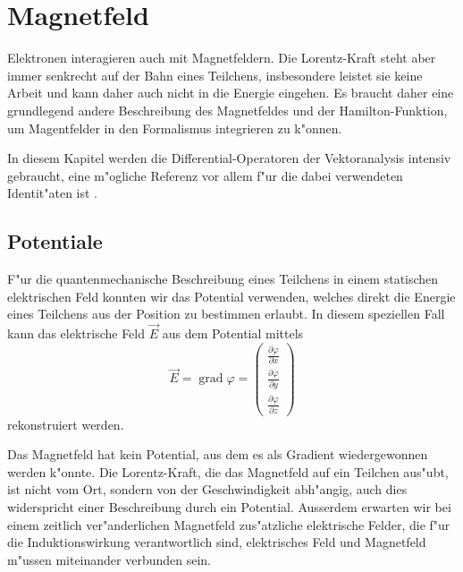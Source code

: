 \chapter{Magnetfeld\label{chapter:magnetfeld}}
\rhead{}
Elektronen interagieren auch mit Magnetfeldern. Die Lorentz-Kraft
steht aber immer senkrecht auf der Bahn eines Teilchens, insbesondere
leistet sie keine Arbeit und kann daher auch nicht in die Energie
eingehen.
Es braucht daher eine grundlegend andere Beschreibung des Magnetfeldes
und der Hamilton-Funktion, um Magentfelder in den Formalismus
integrieren zu k"onnen.

In diesem Kapitel werden die Differential-Operatoren der Vektoranalysis
intensiv gebraucht, eine m"ogliche Referenz vor allem f"ur die
dabei verwendeten Identit"aten ist \cite{skript:vektoranalysis}.

\section{Potentiale\label{section:vektorpotential}}
F"ur die quantenmechanische Beschreibung eines Teilchens in einem
statischen elektrischen Feld konnten wir das Potential verwenden, welches
direkt die Energie eines Teilchens aus der Position zu bestimmen
erlaubt. In diesem speziellen Fall kann das
elektrische Feld $\vec E$ aus dem Potential mittels
\[
\vec E=\operatorname{grad}\varphi
=
\begin{pmatrix}
\frac{\partial\varphi}{\partial x}\\
\frac{\partial\varphi}{\partial y}\\
\frac{\partial\varphi}{\partial z}
\end{pmatrix}
\]
rekonstruiert werden.

Das Magnetfeld hat kein Potential, aus dem es als Gradient wiedergewonnen
werden k"onnte.
Die Lorentz-Kraft, die das Magnetfeld
auf ein Teilchen aus"ubt, ist nicht vom Ort, sondern von der Geschwindigkeit
abh"angig, auch dies widerspricht einer Beschreibung durch ein Potential.
Ausserdem erwarten wir bei einem zeitlich ver"anderlichen Magnetfeld
zus"atzliche elektrische Felder, die f"ur die Induktionswirkung verantwortlich
sind,
elektrisches Feld und Magnetfeld m"ussen miteinander verbunden sein.

